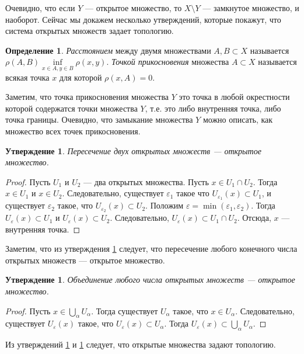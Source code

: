 \documentclass[12pt, titlepage, oneside]{amsbook}
\newtheorem{claim}[theorem]{Утверждение}
\theoremstyle{definition}
\newtheorem{definition}[theorem]{Определение}
\theoremstyle{remark}
\begin{document}
Очевидно, что если $Y$ --- открытое множество, то $X\setminus Y$ --- замкнутое множество, и наоборот.
Сейчас мы докажем несколько утверждений, которые покажут, что система открытых множеств задает топологию.

\begin{definition}
\emph{Расстоянием} между двумя множествами $A,B\subset X$ называется $\rho(A,B)\inf\limits_{x\in A,y\in B}\rho(x,y)$. \emph{Точкой прикосновения} множества $A\subset X$ называется всякая точка $x$ для которой $\rho(x,A)=0$.
\end{definition}

Заметим, что точка прикосновения множества $Y$ это точка в любой окрестности которой содержатся точки множества $Y$, т.е. это либо внутренняя точка, либо точка границы. Очевидно, что замыкание множества $Y$ можно описать, как множество всех точек прикосновения.

\begin{claim}
\label{Met2}
Пересечение двух открытых множеств --- открытое множество.
\end{claim}

\begin{proof}
Пусть $U_1$ и $U_2$ --- два открытых множества. Пусть $x\in U_1\cap U_2$. Тогда $x\in U_1$ и $x\in U_2$. Следовательно, существует $\varepsilon_1$ такое что $U_{\varepsilon_1}(x)\subset U_1$, и существует $\varepsilon_2$ такое, что $U_{\varepsilon_2}(x)\subset U_2$. Положим $\varepsilon=\min(\varepsilon_1,\varepsilon_2)$. Тогда $U_{\varepsilon}(x)\subset U_1$ и $U_{\varepsilon}(x)\subset U_2$. Следовательно, $U_{\varepsilon}(x)\subset U_1\cap U_2$. Отсюда, $x$ --- внутренняя точка.
\end{proof}

Заметим, что из утверждения \ref{Met2} следует, что пересечение любого конечного числа открытых множеств --- открытое множество.

 \begin{claim}
\label{Met3}
Объединение любого числа открытых множеств --- открытое множество.
\end{claim}

\begin{proof}
Пусть $x\in\bigcup\limits_{\alpha} U_\alpha$. Тогда существует $U_\alpha$ такое, что $x\in U_\alpha$. Следовательно, существует $U_{\varepsilon}(x)$ такое, что $U_{\varepsilon}(x)\subset U_\alpha$. Тогда $U_{\varepsilon}(x)\subset \bigcup\limits_{\alpha} U_\alpha$.
\end{proof}

Из утверждений \ref{Met2} и \ref{Met3} следует, что открытые множества задают топологию.
\end{document}
